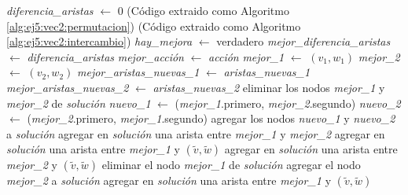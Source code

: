 \begin{algorithm}[H]
     {
         {
            \textit{diferencia\_aristas} $\gets$ $0$ \;
             {
                (Código extraido como Algoritmo \ref{alg:ej5:vec2:permutacion})
            }
             {
                (Código extraido como Algoritmo \ref{alg:ej5:vec2:intercambio})
            }
             {
                \textit{hay\_mejora} $\gets$ \textsf{verdadero} \;
                \textit{mejor\_diferencia\_aristas} $\gets$ \textit{diferencia\_aristas} \;
                \textit{mejor\_acción} $\gets$ \textit{acción} \;
                \textit{mejor\_1} $\gets$ $(v_1, w_1)$ \;
                \textit{mejor\_2} $\gets$ $(v_2, w_2)$ \;
                \textit{mejor\_aristas\_nuevas\_1} $\gets$ \textit{aristas\_nuevas\_1} \;
                \textit{mejor\_aristas\_nuevas\_2} $\gets$ \textit{aristas\_nuevas\_2} \;
            }
        }
    }
     {
         {
            eliminar los nodos \textit{mejor\_1} y \textit{mejor\_2} de \textit{solución} \;
            \textit{nuevo\_1} $\gets$ (\textit{mejor\_1}.primero, \textit{mejor\_2}.segundo) \;
            \textit{nuevo\_2} $\gets$ (\textit{mejor\_2}.primero, \textit{mejor\_1}.segundo) \;
            agregar los nodos \textit{nuevo\_1} y \textit{nuevo\_2} a \textit{solución}\;
             {
                agregar en \textit{solución} una arista entre \textit{mejor\_1} y \textit{mejor\_2} \;
            }
             {
                agregar en \textit{solución} una arista entre
                    \textit{mejor\_1} y $(\tilde{v}, \tilde{w})$ \;
            }
             {
                agregar en \textit{solución} una arista entre
                    \textit{mejor\_2} y $(\tilde{v}, \tilde{w})$ \;
            }
        }
         {
            eliminar el nodo \textit{mejor\_1} de \textit{solución} \;
            agregar el nodo \textit{mejor\_2} a \textit{solución} \;
             {
                agregar en \textit{solución} una arista entre
                    \textit{mejor\_1} y $(\tilde{v}, \tilde{w})$ \;
            }
        }
    } {
    }
\end{algorithm}
\bigskip

